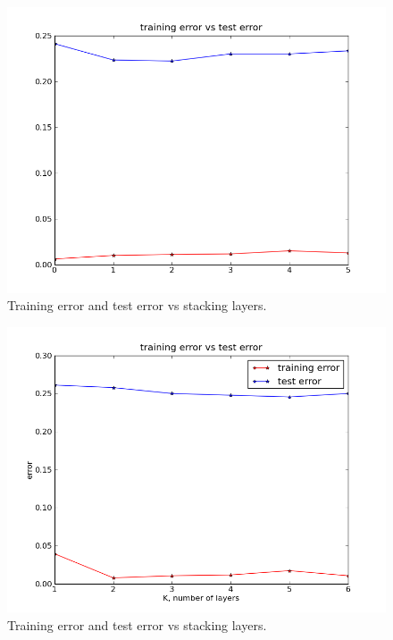 \documentclass[a4paper,11pt]{article}
\begin{document}
\begin{figure}[!ht]
  \centering
  \includegraphics[width=4.5in]{WU5/trainingvstestD3R.png}
  \caption{Training error and test error vs stacking layers.}
  \label{figures:f1}
\end{figure}

\newpage

\begin{figure}[!ht]
  \centering
  \includegraphics[width=4.5in]{WU5/trainingvstestD2R.png}
  \caption{Training error and test error vs stacking layers.}
  \label{figures:f2}
\end{figure}
\end{document}
